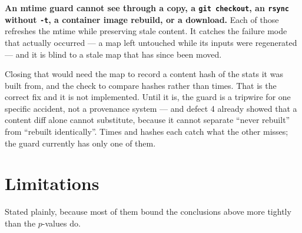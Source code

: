 \documentclass[11pt]{article}
\newcommand{\code}[1]{\texttt{#1}}
\newenvironment{aside}%
{\par\needspace{4\baselineskip}\vspace{0.8ex}%
\begin{lrbox}{\asidebox}\begin{minipage}{\dimexpr\textwidth-18pt\relax}\small}%
{\end{minipage}\end{lrbox}%
\noindent\setlength{\fboxsep}{9pt}\colorbox{warnbg}{\usebox{\asidebox}}%
\vspace{0.6ex}\par}
\begin{document}
\begin{aside}
\textbf{An mtime guard cannot see through a copy, a \code{git checkout}, an \code{rsync} without
\code{-t}, a container image rebuild, or a download.} Each of those refreshes the mtime while
preserving stale content. It catches the failure mode that actually occurred --- a map left
untouched while its inputs were regenerated --- and it is blind to a stale map that has since been
moved.
\end{aside}

Closing that would need the map to record a content hash of the stats it was built from, and the
check to compare hashes rather than times. That is the correct fix and it is not implemented. Until
it is, the guard is a tripwire for one specific accident, not a provenance system --- and defect 4
already showed that a content diff alone cannot substitute, because it cannot separate ``never
rebuilt'' from ``rebuilt identically''. Times and hashes each catch what the other misses; the
guard currently has only one of them.

\section{Limitations}
\label{sec:limits}

Stated plainly, because most of them bound the conclusions above more tightly than the $p$-values
do.
\end{document}
